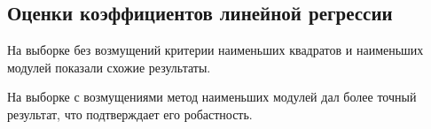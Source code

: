 \subsection{Оценки коэффициентов линейной регрессии}

На выборке без возмущений критерии наименьших квадратов и наименьших модулей показали схожие результаты.

На выборке с возмущениями метод наименьших модулей дал более точный результат, что подтверждает его робастность.